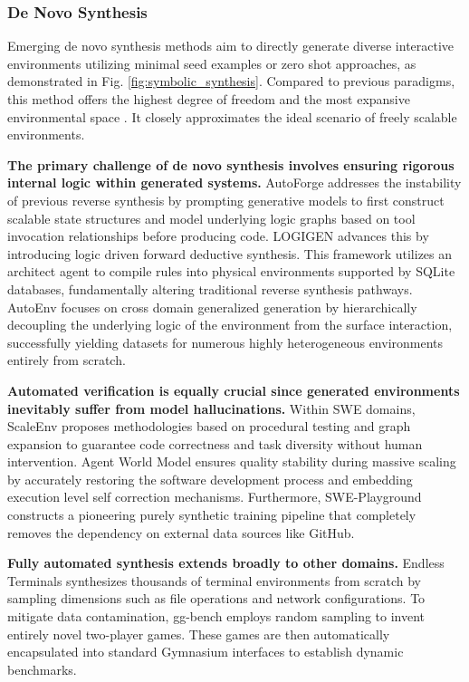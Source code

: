 \subsubsection{De Novo Synthesis}
\label{sec:synthesis from scratch}

Emerging de novo synthesis methods aim to directly generate diverse interactive environments utilizing minimal seed examples or zero shot approaches, as demonstrated in Fig. \ref{fig:symbolic_synthesis}. Compared to previous paradigms, this method offers the highest degree of freedom and the most expansive environmental space \cite{DeepSeek-V3.2, LongCat-Flash-Thinking-2601, AutoEnv, LOGIGEN, InfiniteWeb, NL2Plan, RandomWorld, MiMo-V2-Flash}. It closely approximates the ideal scenario of freely scalable environments.

\textbf{The primary challenge of de novo synthesis involves ensuring rigorous internal logic within generated systems.} AutoForge \cite{AutoForge} addresses the instability of previous reverse synthesis by prompting generative models to first construct scalable state structures and model underlying logic graphs based on tool invocation relationships before producing code. LOGIGEN \cite{LOGIGEN} advances this by introducing logic driven forward deductive synthesis. This framework utilizes an architect agent to compile rules into physical environments supported by SQLite databases, fundamentally altering traditional reverse synthesis pathways. AutoEnv \cite{AutoEnv} focuses on cross domain generalized generation by hierarchically decoupling the underlying logic of the environment from the surface interaction, successfully yielding datasets for numerous highly heterogeneous environments entirely from scratch.

\textbf{Automated verification is equally crucial since generated environments inevitably suffer from model hallucinations.} Within SWE domains, ScaleEnv \cite{ScaleEnv} proposes methodologies based on procedural testing and graph expansion to guarantee code correctness and task diversity without human intervention. Agent World Model \cite{Agent_world_model} ensures quality stability during massive scaling by accurately restoring the software development process and embedding execution level self correction mechanisms. Furthermore, SWE-Playground \cite{SWE-Playground} constructs a pioneering purely synthetic training pipeline that completely removes the dependency on external data sources like GitHub. 

\textbf{Fully automated synthesis extends broadly to other domains.} Endless Terminals \cite{Endless_Terminals} synthesizes thousands of terminal environments from scratch by sampling dimensions such as file operations and network configurations. To mitigate data contamination, gg-bench \cite{gg-bench} employs random sampling to invent entirely novel two-player games. These games are then automatically encapsulated into standard Gymnasium interfaces to establish dynamic benchmarks.

